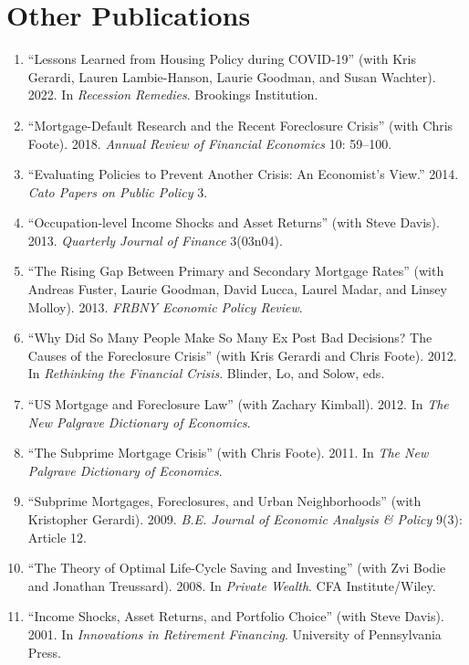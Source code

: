 \documentclass[11pt]{article}
\begin{document}
\section*{Other Publications}
\begin{enumerate}[leftmargin=*, nosep]
\item ``Lessons Learned from Housing Policy during COVID-19'' (with Kris Gerardi, Lauren Lambie-Hanson, Laurie Goodman, and Susan Wachter). 2022. In \textit{Recession Remedies}. Brookings Institution.
\item ``Mortgage-Default Research and the Recent Foreclosure Crisis'' (with Chris Foote). 2018. \textit{Annual Review of Financial Economics} 10: 59--100.
\item ``Evaluating Policies to Prevent Another Crisis: An Economist's View.'' 2014. \textit{Cato Papers on Public Policy} 3.
\item ``Occupation-level Income Shocks and Asset Returns'' (with Steve Davis). 2013. \textit{Quarterly Journal of Finance} 3(03n04).
\item ``The Rising Gap Between Primary and Secondary Mortgage Rates'' (with Andreas Fuster, Laurie Goodman, David Lucca, Laurel Madar, and Linsey Molloy). 2013. \textit{FRBNY Economic Policy Review}.
\item ``Why Did So Many People Make So Many Ex Post Bad Decisions? The Causes of the Foreclosure Crisis'' (with Kris Gerardi and Chris Foote). 2012. In \textit{Rethinking the Financial Crisis}. Blinder, Lo, and Solow, eds.
\item ``US Mortgage and Foreclosure Law'' (with Zachary Kimball). 2012. In \textit{The New Palgrave Dictionary of Economics}.
\item ``The Subprime Mortgage Crisis'' (with Chris Foote). 2011. In \textit{The New Palgrave Dictionary of Economics}.
\item ``Subprime Mortgages, Foreclosures, and Urban Neighborhoods'' (with Kristopher Gerardi). 2009. \textit{B.E. Journal of Economic Analysis \& Policy} 9(3): Article 12.
\item ``The Theory of Optimal Life-Cycle Saving and Investing'' (with Zvi Bodie and Jonathan Treussard). 2008. In \textit{Private Wealth}. CFA Institute/Wiley.
\item ``Income Shocks, Asset Returns, and Portfolio Choice'' (with Steve Davis). 2001. In \textit{Innovations in Retirement Financing}. University of Pennsylvania Press.
\end{enumerate}
\end{document}
